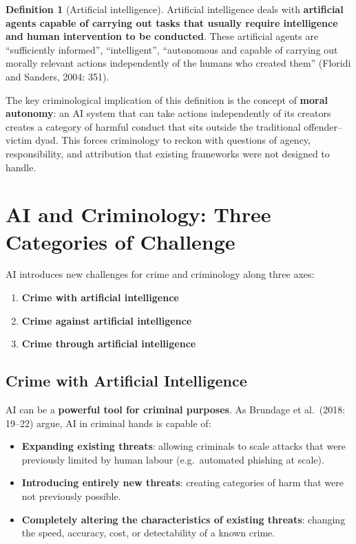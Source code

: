 \documentclass[11pt,a4paper,openany]{report}
\theoremstyle{definition}
\newtheorem{definition}{Definition}[chapter]
\theoremstyle{plain}
\theoremstyle{remark}
\begin{document}
\begin{definition}[Artificial intelligence]
Artificial intelligence deals with \textbf{artificial agents capable of carrying out tasks that usually require intelligence and human intervention to be conducted}. These artificial agents are ``sufficiently informed'', ``intelligent'', ``autonomous and capable of carrying out morally relevant actions independently of the humans who created them'' (Floridi and Sanders, 2004: 351).
\end{definition}

The key criminological implication of this definition is the concept of \textbf{moral autonomy}: an AI system that can take actions independently of its creators creates a category of harmful conduct that sits outside the traditional offender--victim dyad. This forces criminology to reckon with questions of agency, responsibility, and attribution that existing frameworks were not designed to handle.

\section{AI and Criminology: Three Categories of Challenge}

AI introduces new challenges for crime and criminology along three axes:

\begin{enumerate}
    \item \textbf{Crime with artificial intelligence}
    \item \textbf{Crime against artificial intelligence}
    \item \textbf{Crime through artificial intelligence}
\end{enumerate}

\subsection{Crime with Artificial Intelligence}

AI can be a \textbf{powerful tool for criminal purposes}. As Brundage et al.\ (2018: 19--22) argue, AI in criminal hands is capable of:
\begin{itemize}
    \item \textbf{Expanding existing threats}: allowing criminals to scale attacks that were previously limited by human labour (e.g.\ automated phishing at scale).
    \item \textbf{Introducing entirely new threats}: creating categories of harm that were not previously possible.
    \item \textbf{Completely altering the characteristics of existing threats}: changing the speed, accuracy, cost, or detectability of a known crime.
\end{itemize}
\end{document}
